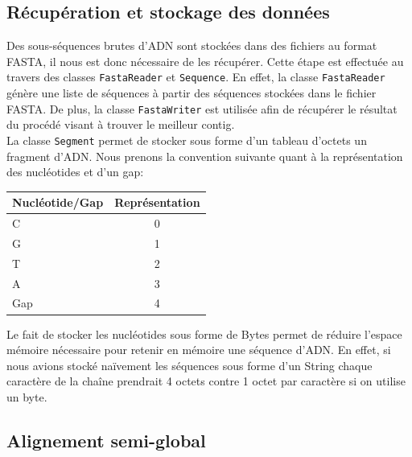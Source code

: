 \subsection{Récupération et stockage des données}
\label{subsection:recStock}

Des sous-séquences brutes d'ADN sont stockées dans des fichiers au format FASTA, il nous est donc nécessaire de les récupérer. Cette étape est effectuée au travers des classes \verb|FastaReader| et \verb|Sequence|. En effet, la classe \verb|FastaReader| génère une liste de séquences à partir des séquences stockées dans le fichier FASTA. De plus, la classe \verb|FastaWriter| est utilisée afin de récupérer le résultat du procédé visant à trouver le meilleur contig.
\\

La classe \verb|Segment| permet de stocker sous forme d'un tableau d'octets un fragment d'ADN. Nous prenons la convention suivante quant à la représentation des nucléotides et d'un gap:
	\begin{center}
		\begin{tabular}{|l|c|}
			\hline
			Nucléotide/Gap & Représentation \\
			\hline
			\hline
			C & 0 \\
			\hline
			G & 1\\
			\hline
			T &  2 \\
			\hline
			A &  3 \\
			\hline
			Gap & 4 \\
			\hline

		\end{tabular}
	\end{center}

	Le fait de stocker les nucléotides sous forme de Bytes permet de réduire l'espace mémoire nécessaire pour retenir en mémoire une séquence d'ADN. En effet, si nous avions stocké naïvement les séquences sous forme d'un String chaque caractère de la chaîne prendrait 4 octets contre 1 octet par caractère si on utilise un byte.

\subsection{Alignement semi-global}
\label{subsection:semiGlobal}

